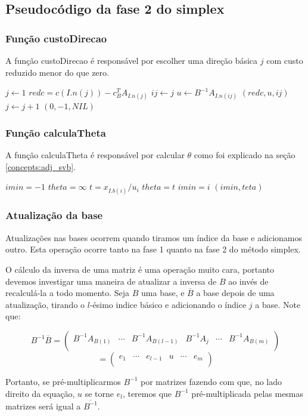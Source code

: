 \documentclass[12pt]{article}
\begin{document}
\subsection{Pseudocódigo da fase 2 do simplex}
\subsubsection{Função custoDirecao}
A função custoDirecao é responsável por escolher uma direção básica $j$ com custo reduzido menor do que zero.
\begin{algorithmic}
	\State $j \gets 1$
		\State $redc = c(I.n(j)) - c^T_BA_{I.n(j)}$
			\State $ij \gets j$
			\State $u \gets B^{-1}A_{I.n(ij)}$
			\Return $(redc, u, ij)$
		\EndIf
		\State $j \gets j + 1$		
	\EndWhile
	\Return $(0, -1, NIL)$
\EndFunction
\end{algorithmic}


\subsubsection{Função calculaTheta}
A função calculaTheta é responsável por calcular $\theta$ como foi explicado na seção \ref{concepts:adj_svb}.
\begin{algorithmic}
	\State $imin = -1$
	\State $theta = \infty$
			\State $t = x_{I.b(i)} / u_i$
				\State $theta = t$
				\State $imin = i$
			\EndIf
		\EndIf
	\EndFor
	\Return $(imin, teta)$
\EndFunction
\end{algorithmic}


\subsubsection{Atualização da base}
Atualizações nas bases ocorrem quando tiramos um índice da base e adicionamos outro. Esta operação ocorre tanto na fase 1 quanto na fase 2 do método simplex.

O cálculo da inversa de uma matriz é uma operação muito cara, portanto devemos investigar uma maneira de atualizar a inversa de $B$ ao invés de recalculá-la a todo momento. Seja $B$ uma base, e $\overline{B}$ a base depois de uma atualização, tirando o $l$-ésimo indice básico e adicionando o índice $j$ a base. Note que:
\begin{center}
$$
B^{-1}\overline{B} =
\begin{pmatrix}
B^{-1}A_{B(1)}  & \cdots & B^{-1}A_{B(l - 1)} & B^{-1}A_j & \cdots & B^{-1}A_{B(m)} \\    
\end{pmatrix}
$$
$$
=\begin{pmatrix}
e_1  & \cdots & e_{l-1} & u & \cdots & e_m \\    
\end{pmatrix}
$$
\end{center}
Portanto, se pré-multiplicarmos $B^{-1}$ por matrizes fazendo com que, no lado direito da equação, $u$ se torne $e_l$, teremos que $B^{-1}$ pré-multiplicada pelas mesmas matrizes será igual a $\overline{B^{-1}}$.
\end{document}
